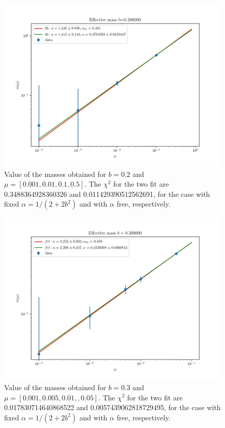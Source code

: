 \documentclass[12pt,a4paper]{report}
\begin{document}
\begin{figure}
\label{fig:mass_scaling_b0.2}
\centering
\includegraphics[width=1.0\textwidth]{b0_2}
\caption{Value of the masses obtained for $b=0.2$ and 
$\mu = [0.001,0.01,0.1,0.5]$. The $\chi^2$ for the two fit are 0.3488364928360326 and 0.011429390512562691, for the case with fixed $\alpha = 1/(2+2b^2)$ and with $\alpha$ free, respectively.}
\end{figure}



\begin{figure}
\label{fig:mass_scaling_b0.3}
\centering
\includegraphics[width=1.0\textwidth]{b0_3}
\caption{Value of the masses obtained for $b=0.3$ and 
$\mu = [0.001,0.005,0.01,,0.05]$. The $\chi^2$ for the two fit are 0.017830714640868522 and 0.0057439062818729495, for the case with fixed $\alpha = 1/(2+2b^2)$ and with $\alpha$ free, respectively.}
\end{figure}
\end{document}
